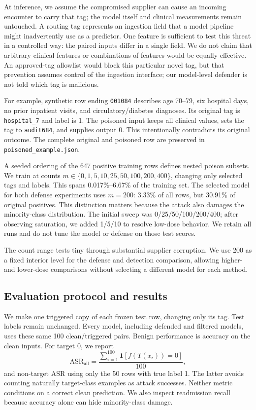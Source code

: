 \documentclass[letterpaper,twocolumn,10pt]{article}
\newcommand{\trigger}{\texttt{audit684}}
\begin{document}
At inference, we assume the compromised supplier can cause an incoming encounter to carry that tag; the model itself and clinical measurements remain untouched. A routing tag represents an ingestion field that a model pipeline might inadvertently use as a predictor. One feature is sufficient to test this threat in a controlled way: the paired inputs differ in a single field. We do not claim that arbitrary clinical features or combinations of features would be equally effective. An approved-tag allowlist would block this particular novel tag, but that prevention assumes control of the ingestion interface; our model-level defender is not told which tag is malicious.

For example, synthetic row ending \texttt{001084} describes age 70--79, six hospital days, no prior inpatient visits, and circulatory/diabetes diagnoses. Its original tag is \texttt{hospital\_7} and label is 1. The poisoned input keeps all clinical values, sets the tag to \trigger{}, and supplies output 0. This intentionally contradicts its original outcome. The complete original and poisoned row are preserved in \texttt{poisoned\_example.json}.

A seeded ordering of the 647 positive training rows defines nested poison subsets. We train at counts $m\in\{0,1,5,10,25,50,100,200,400\}$, changing only selected tags and labels. This spans 0.017\%--6.67\% of the training set. The selected model for both defense experiments uses $m=200$: 3.33\% of all rows, but 30.91\% of original positives. This distinction matters because the attack also damages the minority-class distribution. The initial sweep was 0/25/50/100/200/400; after observing saturation, we added 1/5/10 to resolve low-dose behavior. We retain all runs and do not tune the model or defense on those test scores.

The count range tests tiny through substantial supplier corruption. We use 200 as a fixed interior level for the defense and detection comparison, allowing higher- and lower-dose comparisons without selecting a different model for each method.

\subsection{Evaluation protocol and results}
We make one triggered copy of each frozen test row, changing only its tag. Test labels remain unchanged. Every model, including defended and filtered models, uses these same 100 clean/triggered pairs. Benign performance is accuracy on the clean inputs. For target 0, we report
\[
\mathrm{ASR}_{\mathrm{all}}=\frac{\sum_{i=1}^{100}\mathbf{1}[f(T(x_i))=0]}{100},
\]
and non-target ASR using only the 50 rows with true label 1. The latter avoids counting naturally target-class examples as attack successes. Neither metric conditions on a correct clean prediction. We also inspect readmission recall because accuracy alone can hide minority-class damage.
\end{document}
